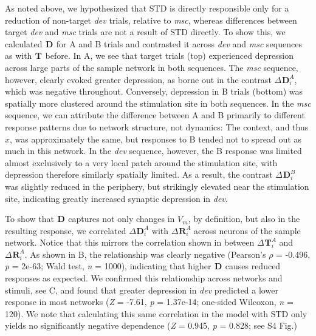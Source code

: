 \documentclass[9pt,lineno,onehalfspacing]{elife}
\newcommand{\dev}{\textit{dev}}
\newcommand{\msc}{\textit{msc}}
\newcommand{\R}[3][]{{}^{#1}_{}\boldsymbol R^{#2}_{#3}}
\newcommand{\T}[3][]{{}^{#1}_{}\boldsymbol T^{#2}_{#3}}
\newcommand{\D}[3][]{{}^{#1}_{}\boldsymbol D^{#2}_{#3}}
\begin{document}
As noted above, we hypothesized that STD is directly responsible only for a reduction of non-target \dev{} trials, relative to \msc{}, whereas differences between target \dev{} and \msc{} trials are not a result of STD directly. To show this, we calculated $\D{}{}$ for A and B trials and contrasted it across \dev{} and \msc{} sequences as with $\T{}{}$ before.
In A, we see that target trials (top) experienced depression across large parts of the sample network in both sequences. The \msc{} sequence, however, clearly evoked greater depression, as borne out in the contrast $\Delta \D{A}{i}$, which was negative throughout. Conversely, depression in B trials (bottom) was spatially more clustered around the stimulation site in both sequences. In the \msc{} sequence, we can attribute the difference between A and B primarily to different response patterns due to network structure, not dynamics: The context, and thus $x$, was approximately the same, but responses to B tended not to spread out as much in this network. In the \dev{} sequence, however, the B response was limited almost exclusively to a very local patch around the stimulation site, with depression therefore similarly spatially limited. As a result, the contrast $\Delta \D{B}{i}$ was slightly reduced in the periphery, but strikingly elevated near the stimulation site, indicating greatly increased synaptic depression in \dev{}.

To show that $\D{}{}$ captures not only changes in $V_m$, by definition, but also in the resulting response, we correlated $\Delta \D{A}{i}$ with $\Delta \R{A}{i}$ across neurons of the sample network. Notice that this mirrors the correlation shown in  between $\Delta \T{A}{i}$ and $\Delta \R{A}{i}$. As shown in B, the relationship was clearly negative (Pearson's $\rho$ = -0.496, \textit{p} = 2e-63; Wald test, \textit{n} = 1000), indicating that higher $\D{}{}$ causes reduced responses as expected. We confirmed this relationship across networks and stimuli, see C, and found that greater depression in \dev{} predicted a lower response in most networks (\textit{Z} = -7.61, \textit{p} = 1.37e-14; one-sided Wilcoxon, \textit{n} = 120). We note that calculating this same correlation in the model with STD only yields no significantly negative dependence (\textit{Z} = 0.945, \textit{p} = 0.828; see S4 Fig.)
\end{document}
